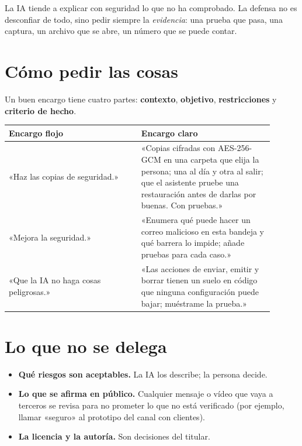 \begin{warnbox}
La IA tiende a explicar con seguridad lo que no ha comprobado. La defensa no es desconfiar de todo, sino pedir siempre la \emph{evidencia}: una prueba que pasa, una captura, un archivo que se abre, un número que se puede contar.
\end{warnbox}

\section{Cómo pedir las cosas}
Un buen encargo tiene cuatro partes: \textbf{contexto}, \textbf{objetivo}, \textbf{restricciones} y \textbf{criterio de hecho}.

\begin{center}
\small
\begin{tabular}{@{}p{0.45\linewidth}p{0.45\linewidth}@{}}
\toprule
\textbf{Encargo flojo} & \textbf{Encargo claro} \\
\midrule
«Haz las copias de seguridad.» & «Copias cifradas con AES-256-GCM en una carpeta que elija la persona; una al día y otra al salir; que el asistente pruebe una restauración antes de darlas por buenas. Con pruebas.» \\
«Mejora la seguridad.» & «Enumera qué puede hacer un correo malicioso en esta bandeja y qué barrera lo impide; añade pruebas para cada caso.» \\
«Que la IA no haga cosas peligrosas.» & «Las acciones de enviar, emitir y borrar tienen un suelo en código que ninguna configuración puede bajar; muéstrame la prueba.» \\
\bottomrule
\end{tabular}
\end{center}

\section{Lo que no se delega}
\begin{itemize}
\item \textbf{Qué riesgos son aceptables.} La IA los describe; la persona decide.
\item \textbf{Lo que se afirma en público.} Cualquier mensaje o vídeo que vaya a terceros se revisa para no prometer lo que no está verificado (por ejemplo, llamar «seguro» al prototipo del canal con clientes).
\item \textbf{La licencia y la autoría.} Son decisiones del titular.
\end{itemize}

